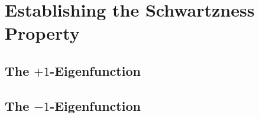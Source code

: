 \section{Establishing the Schwartzness Property}


\subsection{The $+1$-Eigenfunction}

\subsection{The $-1$-Eigenfunction}